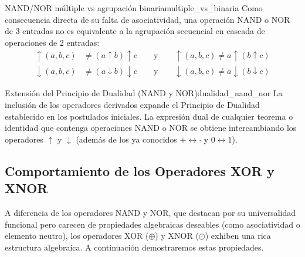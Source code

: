 \begin{teorema}{NAND/NOR múltiple vs agrupación binaria}{multiple_vs_binaria}
Como consecuencia directa de su falta de asociatividad, una operación NAND o NOR de 3 entradas no es equivalente a la agrupación secuencial en cascada de operaciones de 2 entradas:
\begin{align*}
    \uparrow(a,b,c) &\neq (a \uparrow b) \uparrow c \qquad \text{y} \qquad \uparrow(a,b,c) \neq a \uparrow (b \uparrow c) \\
    \downarrow(a,b,c) &\neq (a \downarrow b) \downarrow c \qquad \text{y} \qquad \downarrow(a,b,c) \neq a \downarrow (b \downarrow c)
\end{align*}
\end{teorema}

\begin{teorema}{Extensión del Principio de Dualidad (NAND y NOR)}{dualidad_nand_nor}
La inclusión de los operadores derivados expande el Principio de Dualidad establecido en los postulados iniciales. La expresión dual de cualquier teorema o identidad que contenga operaciones NAND o NOR se obtiene intercambiando los operadores $\uparrow$ y $\downarrow$ (además de los ya conocidos $+ \leftrightarrow \cdot$ y $0 \leftrightarrow 1$).
\end{teorema}
\subsection{Comportamiento de los Operadores XOR y XNOR}
A diferencia de los operadores NAND y NOR, que destacan por su universalidad funcional pero carecen de propiedades algebraicas deseables (como asociatividad o elemento neutro), los operadores XOR ($\oplus$) y XNOR ($\odot$) exhiben una rica estructura algebraica. A continuación demostraremos estas propiedades.

